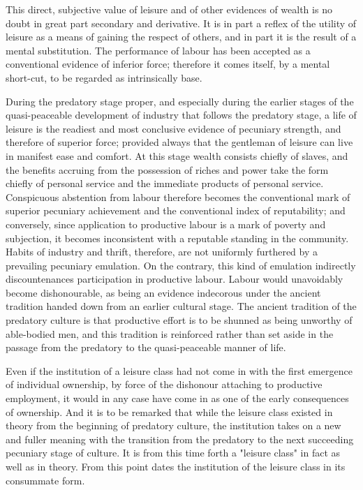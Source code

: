 \documentclass[12pt]{report}
\begin{document}
This direct, subjective value of leisure and of other evidences of
wealth is no doubt in great part secondary and derivative. It is in part
a reflex of the utility of leisure as a means of gaining the respect
of others, and in part it is the result of a mental substitution. The
performance of labour has been accepted as a conventional evidence of
inferior force; therefore it comes itself, by a mental short-cut, to be
regarded as intrinsically base.

During the predatory stage proper, and especially during the earlier
stages of the quasi-peaceable development of industry that follows the
predatory stage, a life of leisure is the readiest and most conclusive
evidence of pecuniary strength, and therefore of superior force;
provided always that the gentleman of leisure can live in manifest ease
and comfort. At this stage wealth consists chiefly of slaves, and the
benefits accruing from the possession of riches and power take the
form chiefly of personal service and the immediate products of personal
service. Conspicuous abstention from labour therefore becomes the
conventional mark of superior pecuniary achievement and the conventional
index of reputability; and conversely, since application to productive
labour is a mark of poverty and subjection, it becomes inconsistent with
a reputable standing in the community. Habits of industry and thrift,
therefore, are not uniformly furthered by a prevailing pecuniary
emulation. On the contrary, this kind of emulation indirectly
discountenances participation in productive labour. Labour would
unavoidably become dishonourable, as being an evidence indecorous under
the ancient tradition handed down from an earlier cultural stage. The
ancient tradition of the predatory culture is that productive effort is
to be shunned as being unworthy of able-bodied men, and this tradition
is reinforced rather than set aside in the passage from the predatory to
the quasi-peaceable manner of life.

Even if the institution of a leisure class had not come in with the
first emergence of individual ownership, by force of the dishonour
attaching to productive employment, it would in any case have come in
as one of the early consequences of ownership. And it is to be remarked
that while the leisure class existed in theory from the beginning of
predatory culture, the institution takes on a new and fuller meaning
with the transition from the predatory to the next succeeding pecuniary
stage of culture. It is from this time forth a "leisure class" in fact
as well as in theory. From this point dates the institution of the
leisure class in its consummate form.
\end{document}
